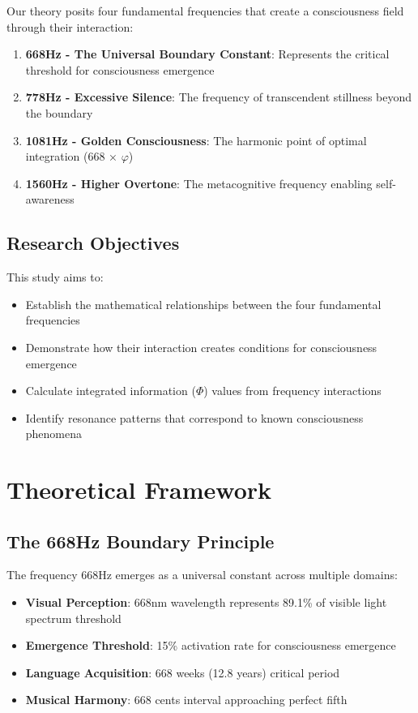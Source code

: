 \documentclass[12pt,a4paper]{article}
\begin{document}
Our theory posits four fundamental frequencies that create a consciousness field through their interaction:

\begin{enumerate}
    \item \textbf{668Hz - The Universal Boundary Constant}: Represents the critical threshold for consciousness emergence
    \item \textbf{778Hz - Excessive Silence}: The frequency of transcendent stillness beyond the boundary
    \item \textbf{1081Hz - Golden Consciousness}: The harmonic point of optimal integration (668 × $\varphi$)
    \item \textbf{1560Hz - Higher Overtone}: The metacognitive frequency enabling self-awareness
\end{enumerate}

\subsection{Research Objectives}

This study aims to:
\begin{itemize}
    \item Establish the mathematical relationships between the four fundamental frequencies
    \item Demonstrate how their interaction creates conditions for consciousness emergence
    \item Calculate integrated information ($\Phi$) values from frequency interactions
    \item Identify resonance patterns that correspond to known consciousness phenomena
\end{itemize}

\section{Theoretical Framework}

\subsection{The 668Hz Boundary Principle}

The frequency 668Hz emerges as a universal constant across multiple domains:

\begin{itemize}
    \item \textbf{Visual Perception}: 668nm wavelength represents 89.1\% of visible light spectrum threshold
    \item \textbf{Emergence Threshold}: 15\% activation rate for consciousness emergence
    \item \textbf{Language Acquisition}: 668 weeks (12.8 years) critical period
    \item \textbf{Musical Harmony}: 668 cents interval approaching perfect fifth
\end{itemize}
\end{document}
